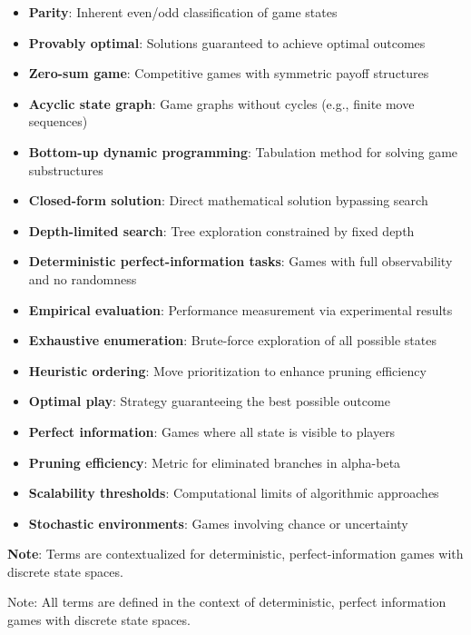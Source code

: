 \documentclass[12pt]{article}
\begin{document}
\begin{itemize}
\item[] \textbf{Parity}: Inherent even/odd classification of game states
\item[] \textbf{Provably optimal}: Solutions guaranteed to achieve optimal outcomes
\item[] \textbf{Zero-sum game}: Competitive games with symmetric payoff structures
\item[] \textbf{Acyclic state graph}: Game graphs without cycles (e.g., finite move sequences)
\item[] \textbf{Bottom-up dynamic programming}: Tabulation method for solving game substructures
\item[] \textbf{Closed-form solution}: Direct mathematical solution bypassing search
\item[] \textbf{Depth-limited search}: Tree exploration constrained by fixed depth
\item[] \textbf{Deterministic perfect-information tasks}: Games with full observability and no randomness
\item[] \textbf{Empirical evaluation}: Performance measurement via experimental results
\item[] \textbf{Exhaustive enumeration}: Brute-force exploration of all possible states
\item[] \textbf{Heuristic ordering}: Move prioritization to enhance pruning efficiency
\item[] \textbf{Optimal play}: Strategy guaranteeing the best possible outcome
\item[] \textbf{Perfect information}: Games  where all state is visible to players
\item[] \textbf{Pruning efficiency}: Metric for eliminated branches in alpha-beta
\item[] \textbf{Scalability thresholds}: Computational limits of algorithmic approaches
\item[] \textbf{Stochastic environments}: Games involving chance or uncertainty
\end{itemize}

\vspace{5mm}
\noindent \textbf{Note}: Terms are contextualized for deterministic, perfect-information games with discrete state spaces.

\vspace{5mm}
\noindent Note: All terms are defined in the context of deterministic, perfect information games with discrete state spaces.
\end{document}
